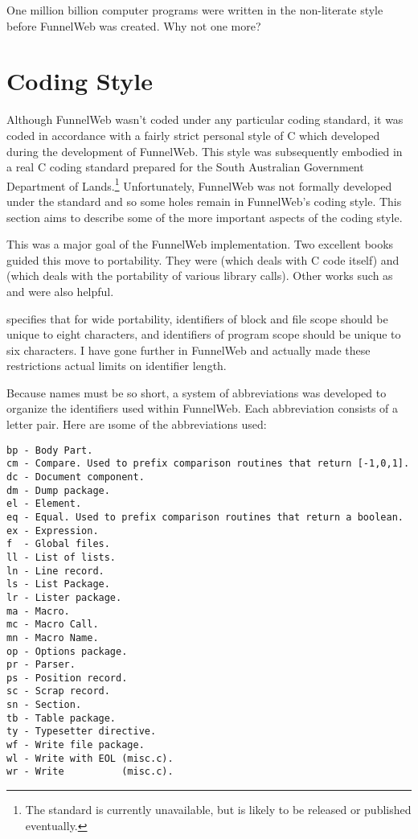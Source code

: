 One million billion computer programs were written in the non-literate
style before FunnelWeb was created. Why not one more?

\section{Coding Style}

Although FunnelWeb wasn't coded under any particular coding standard,
it was coded in accordance with a fairly strict personal style of C
which developed during the development of FunnelWeb. This style was
subsequently embodied in a real C coding standard prepared for the
South
Australian Government
Department of Lands.\footnote{The standard
is currently unavailable, but is likely to be released or
published eventually.} Unfortunately, FunnelWeb was not
formally developed under the standard and so some holes remain in
FunnelWeb's coding style. This section aims to describe some of the more
important aspects of the coding style.

 This
was a major goal of the FunnelWeb implementation.
Two excellent books guided this move to portability.
They were  (which deals with C code itself)
and  (which deals with the portability of various library
calls). Other works such as  and
 were also helpful.

 
specifies that for
wide portability, identifiers of block and file scope should be unique to
eight characters, and identifiers of program scope should be unique to
six characters. I have gone further in FunnelWeb and actually made these
restrictions actual limits on identifier length.

Because names must be so short, a system of abbreviations was developed to
organize the identifiers used within FunnelWeb. Each abbreviation consists
of a letter pair. Here are \i{some} of the abbreviations
used:

\begin{verbatim}
bp - Body Part.
cm - Compare. Used to prefix comparison routines that return [-1,0,1].
dc - Document component.
dm - Dump package.
el - Element.
eq - Equal. Used to prefix comparison routines that return a boolean.
ex - Expression.
f  - Global files.
ll - List of lists.
ln - Line record.
ls - List Package.
lr - Lister package.
ma - Macro.
mc - Macro Call.
mn - Macro Name.
op - Options package.
pr - Parser.
ps - Position record.
sc - Scrap record.
sn - Section.
tb - Table package.
ty - Typesetter directive.
wf - Write file package.
wl - Write with EOL (misc.c).
wr - Write          (misc.c).
\end{verbatim}

